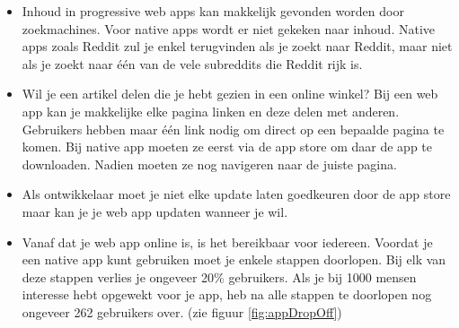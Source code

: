 \begin{itemize}  
	\item Inhoud in progressive web apps kan makkelijk gevonden worden door zoekmachines. Voor native apps wordt er niet gekeken naar inhoud. Native apps zoals Reddit zul je enkel terugvinden als je zoekt naar Reddit, maar niet als je zoekt naar één van de vele subreddits die Reddit rijk is. 
	\item Wil je een artikel delen die je hebt gezien in een online winkel? Bij een web app kan je makkelijke elke pagina linken en deze delen met anderen. Gebruikers hebben maar één link nodig om direct op een bepaalde pagina te komen. Bij native app moeten ze eerst via de app store om daar de app te downloaden. Nadien moeten ze nog navigeren naar de juiste pagina. 
	\item Als ontwikkelaar moet je niet elke update laten goedkeuren door de app store maar kan je je web app updaten wanneer je wil.
	\item Vanaf dat je web app online is, is het bereikbaar voor iedereen. Voordat je een native app kunt gebruiken moet je enkele stappen doorlopen. Bij elk van deze stappen verlies je ongeveer 20\% gebruikers. Als je bij 1000 mensen interesse hebt opgewekt voor je app, heb na alle stappen te doorlopen nog ongeveer 262 gebruikers over. (zie figuur \ref{fig:appDropOff})
\end{itemize}

